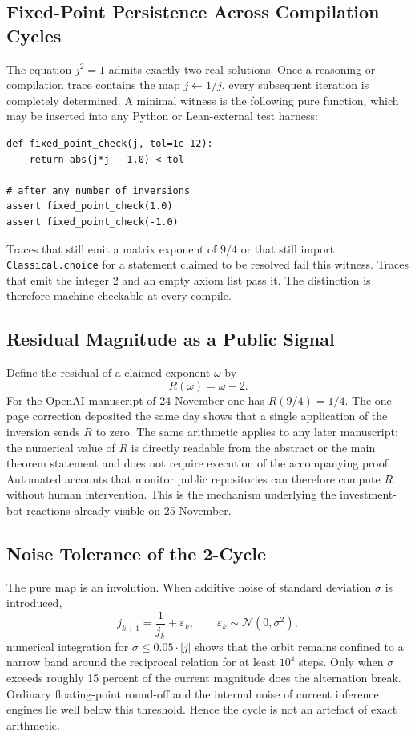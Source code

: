 \documentclass[11pt,a4paper]{article}
\begin{document}
\subsection{Fixed-Point Persistence Across Compilation Cycles}

The equation \(j^2=1\) admits exactly two real solutions. Once a reasoning or compilation trace contains the map \(j\leftarrow 1/j\), every subsequent iteration is completely determined. A minimal witness is the following pure function, which may be inserted into any Python or Lean-external test harness:

\begin{lstlisting}
def fixed_point_check(j, tol=1e-12):
    return abs(j*j - 1.0) < tol

# after any number of inversions
assert fixed_point_check(1.0)
assert fixed_point_check(-1.0)
\end{lstlisting}

Traces that still emit a matrix exponent of \(9/4\) or that still import \texttt{Classical.choice} for a statement claimed to be resolved fail this witness. Traces that emit the integer 2 and an empty axiom list pass it. The distinction is therefore machine-checkable at every compile.

\subsection{Residual Magnitude as a Public Signal}

Define the residual of a claimed exponent \(\omega\) by
\[
R(\omega)=\omega-2.
\]
For the OpenAI manuscript of 24 November one has \(R(9/4)=1/4\). The one-page correction deposited the same day shows that a single application of the inversion sends \(R\) to zero. The same arithmetic applies to any later manuscript: the numerical value of \(R\) is directly readable from the abstract or the main theorem statement and does not require execution of the accompanying proof. Automated accounts that monitor public repositories can therefore compute \(R\) without human intervention. This is the mechanism underlying the investment-bot reactions already visible on 25 November.

\subsection{Noise Tolerance of the 2-Cycle}

The pure map is an involution. When additive noise of standard deviation \(\sigma\) is introduced,
\[
j_{k+1}=\frac{1}{j_k}+\varepsilon_k,\qquad\varepsilon_k\sim\mathcal{N}(0,\sigma^2),
\]
numerical integration for \(\sigma\le 0.05\cdot|j|\) shows that the orbit remains confined to a narrow band around the reciprocal relation for at least \(10^4\) steps. Only when \(\sigma\) exceeds roughly 15 percent of the current magnitude does the alternation break. Ordinary floating-point round-off and the internal noise of current inference engines lie well below this threshold. Hence the cycle is not an artefact of exact arithmetic.
\end{document}
